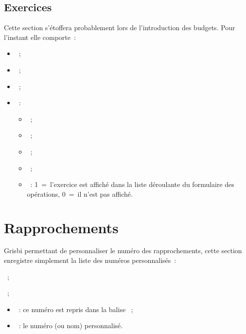 \subsection{Exercices\label{xml-financialyear} }

Cette section s'étoffera probablement lors de l'introduction des budgets. Pour 
l'instant elle comporte~:

\begin{itemize}

\item {}~;

\item {}~;

\item {}~;

\item {}~:

\begin{itemize}

\item {}~;

\item {}~;

\item {}~;

\item {}~;

\item {}~: 1~=~l'exercice est affiché dans la liste déroulante du 
formulaire des opérations, 0~=~il n'est pas affiché.

\end{itemize}

\end{itemize}

\section{Rapprochements\label{xml-reconciliation} }

Grisbi permettant de personnaliser le numéro des rapprochements, cette section 
enregistre simplement la liste des numéros personnalisés~:

~;

~;

\begin{itemize}

\item {}~: ce numéro est repris dans la balise ~;

\item {}~: le numéro (ou nom) personnalisé.

\end{itemize}


